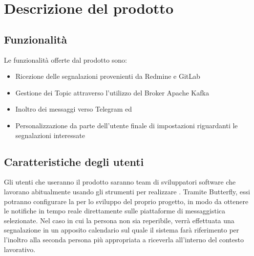 \newpage
\section{Descrizione del prodotto}\label{DescrizioneGenerale}


	\subsection{Funzionalità}

    Le funzionalità offerte dal prodotto sono:
    \begin{itemize}
        \item Ricezione delle segnalazioni provenienti da Redmine e GitLab
        \item Gestione dei Topic attraverso l'utilizzo del Broker Apache Kafka
        \item Inoltro dei messaggi verso Telegram ed \mail
        \item Personalizzazione da parte dell'utente finale di impostazioni riguardanti le segnalazioni interessate
	\end{itemize}

	\subsection{Caratteristiche degli utenti}

    Gli utenti che useranno il prodotto saranno team di sviluppatori software che lavorano abitualmente usando gli strumenti per realizzare .
    Tramite Butterfly, essi potranno configurare la  per lo sviluppo del proprio progetto, in modo da ottenere le notifiche in tempo reale direttamente sulle piattaforme di messaggistica selezionate.
    Nel caso in cui la persona non sia reperibile, verrà effettuata una segnalazione in un apposito calendario sul quale il sistema farà riferimento per l'inoltro alla seconda persona più appropriata a riceverla all'interno del contesto lavorativo.

